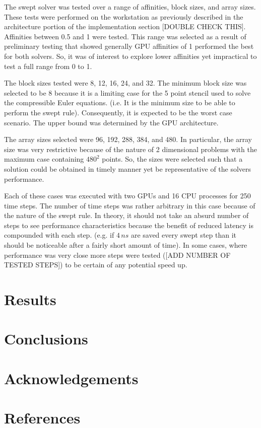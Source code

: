 \documentclass[review]{elsarticle}
\begin{document}
\par
The swept solver was tested over a range of affinities, block sizes, and array sizes. These tests were performed on the workstation as previously described in the architecture portion of the implementation section [DOUBLE CHECK THIS]. Affinities between 0.5 and 1 were tested. This range was selected as a result of preliminary testing that showed generally GPU affinities of 1 performed the best for both solvers. So, it was of interest to explore lower affinities yet impractical to test a full range from 0 to 1.

\par
The block sizes tested were 8, 12, 16, 24, and 32. The minimum block size was selected to be 8 because it is a limiting case for the 5 point stencil used to solve the compressible Euler equations. (i.e. It is the minimum size to be able to perform the swept rule). Consequently, it is expected to be the worst case scenario. The upper bound was determined by the GPU architecture.

\par
The array sizes selected were 96, 192, 288, 384, and 480. In particular, the array size was very restrictive because of the nature of 2 dimensional problems with the maximum case containing $480^2$ points. So, the sizes were selected such that a solution could be obtained in timely manner yet be representative of the solvers performance.

\par Each of these cases was executed with two GPUs and 16 CPU processes for 250 time steps. The number of time steps was rather arbitrary in this case because of the nature of the swept rule. In theory, it should not take an absurd number of steps to see performance characteristics because the benefit of reduced latency is compounded with each step. (e.g. if $4\,ns$ are saved every swept step than it should be noticeable after a fairly short amount of time). In some cases, where performance was very close more steps were tested ([ADD NUMBER OF TESTED STEPS]) to be certain of any potential speed up.

\section{Results}

\section{Conclusions}

\section{Acknowledgements}

\section*{References}


\end{document}
